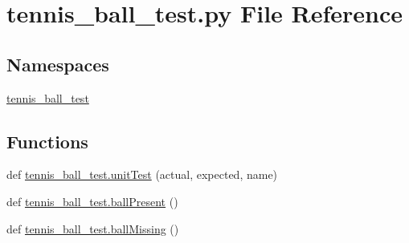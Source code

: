 \section{tennis\+\_\+ball\+\_\+test.\+py File Reference}
\label{tennis__ball__test_8py}
\subsection*{Namespaces}
\begin{DoxyCompactItemize}
\item 
 \hyperlink{namespacetennis__ball__test}{tennis\+\_\+ball\+\_\+test}
\end{DoxyCompactItemize}
\subsection*{Functions}
\begin{DoxyCompactItemize}
\item 
def \hyperlink{namespacetennis__ball__test_a377f9e4b2c183f3b84a826938e92b1d3}{tennis\+\_\+ball\+\_\+test.\+unit\+Test} (actual, expected, name)
\item 
def \hyperlink{namespacetennis__ball__test_ae38438bf59080ab5cb67dc008a0e05b5}{tennis\+\_\+ball\+\_\+test.\+ball\+Present} ()
\item 
def \hyperlink{namespacetennis__ball__test_a62d3502cccff6477767acdf8cf20caab}{tennis\+\_\+ball\+\_\+test.\+ball\+Missing} ()
\end{DoxyCompactItemize}
